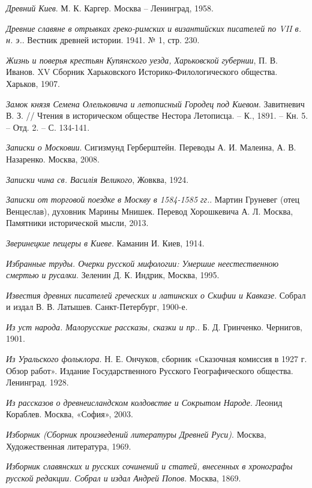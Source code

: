 \emph{Древний Киев}. М. К. Каргер. Москва – Ленинград, 1958.

\emph{Древние славяне в отрывках греко-римских и византийских писателей по VII в. н. э.}. Вестник древней истории. 1941. № 1, стр. 230.

\emph{Жизнь и поверья крестьян Купянского уезда, Харьковской губернии}, П. В. Иванов. XV Сборник Харьковского Историко-Филологического общества. Харьков, 1907.

\emph{Замок князя Семена Олельковича и летописный Городец под Киевом}. Завитневич В. З. // Чтения в историческом обществе Нестора Летописца. – К., 1891. – Кн. 5. – Отд. 2. – С. 134-141.

\emph{Записки о Московии}. Сигизмунд Герберштейн. Переводы А. И. Малеина, А. В. Назаренко. Москва, 2008.

\emph{Записки чина св. Василія Великого}, Жовква, 1924.

\emph{Записки от торговой поездке в Москву в 1584-1585 гг.}. Мартин Груневег (отец Венцеслав), духовник Марины Мнишек. Перевод Хорошкевича А. Л. Москва, Памятники исторической мысли, 2013.

\emph{Зверинецкие пещеры в Киеве}. Каманин И. Киев, 1914.

\emph{Избранные труды. Очерки русской мифологии: Умершие неестественною смертью и русалки}. Зеленин Д. К. Индрик, Москва, 1995.

\emph{Известия древних писателей греческих и латинских о Скифии и Кавказе}. Собрал и издал В. В. Латышев. Санкт-Петербург, 1900-е.

\emph{Из уст народа. Малорусские рассказы, сказки и пр.}. Б. Д. Гринченко. Чернигов, 1901.

\emph{Из Уральского фольклора}. Н. Е. Ончуков, сборник «Сказочная комиссия в 1927 г. Обзор работ». Издание Государственного Русского Географического общества. Ленинград. 1928.

\emph{Из рассказов о древнеисландском колдовстве и Сокрытом Народе}. Леонид Кораблев. Москва, «София», 2003.

\emph{Изборник (Сборник произведений литературы Древней Руси)}. Москва, Художественная литература, 1969.

\emph{Изборник славянских и русских сочинений и статей, внесенных в хронографы русской редакции. Собрал и издал Андрей Попов}. Москва, 1869.

